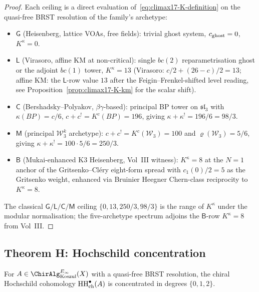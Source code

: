 \begin{proof}
Each ceiling is a direct evaluation of~\eqref{eq:climax17-K-definition}
on the quasi-free BRST resolution of the family's archetype:
\begin{itemize}
\item $\mathsf{G}$ (Heisenberg, lattice VOAs, free fields):
      trivial ghost system, $c_{\mathrm{ghost}}=0$, $K^\kappa=0$.
\item $\mathsf{L}$ (Virasoro, affine KM at non-critical):
      single $bc(2)$ reparametrisation ghost or the adjoint $bc(1)$
      tower, $K^\kappa=13$ (Virasoro: $c/2+(26-c)/2=13$; affine KM:
      the $\mathsf{L}$-row value $13$ after the
      Feigin--Frenkel-shifted level reading, see
      Proposition~\ref{prop:climax17-K-km} for the scalar shift).
\item $\mathsf{C}$ (Bershadsky--Polyakov, $\beta\gamma$-based):
      principal BP tower on $\mathfrak{sl}_3$ with
      $\kappa(BP)=c/6$, $c+c^!=K^c(BP)=196$, giving
      $\kappa+\kappa^!=196/6=98/3$.
\item $\mathsf{M}$ (principal $\mathcal{W}_3^k$ archetype):
      $c+c^!=K^c(\mathcal{W}_3)=100$ and
      $\varrho(\mathcal{W}_3)=5/6$, giving
      $\kappa+\kappa^!=100\cdot 5/6=250/3$.
\item $\mathsf{B}$ (Mukai-enhanced K3 Heisenberg, Vol~III witness):
      $K^\kappa=8$ at the $N=1$ anchor of the Gritsenko--Cl\'ery
      eight-form spread with $c_1(0)/2=5$ as the Gritsenko weight,
      enhanced via Bruinier Heegner Chern-class reciprocity to
      $K^\kappa=8$.
\end{itemize}
The classical $\mathsf{G}/\mathsf{L}/\mathsf{C}/\mathsf{M}$ ceiling
$\{0,13,250/3,98/3\}$ is the range of $K^\kappa$ under the modular
normalisation; the five-archetype spectrum adjoins the
$\mathsf{B}$-row $K^\kappa=8$ from Vol~III.
\end{proof}

\subsection{Theorem H: Hochschild concentration}

\begin{corollary}[Theorem H]
\label{cor:climax17-theoremH-from-climax}
\ClaimStatusProvedHere
For $A\in\ChirAlg^{E_\infty}_{\mathrm{Koszul}}(X)$ with a quasi-free
BRST resolution, the chiral Hochschild cohomology
$\mathrm{HH}^\bullet_{\mathrm{ch}}(A)$ is concentrated in degrees $\{0,1,2\}$.
\end{corollary}

